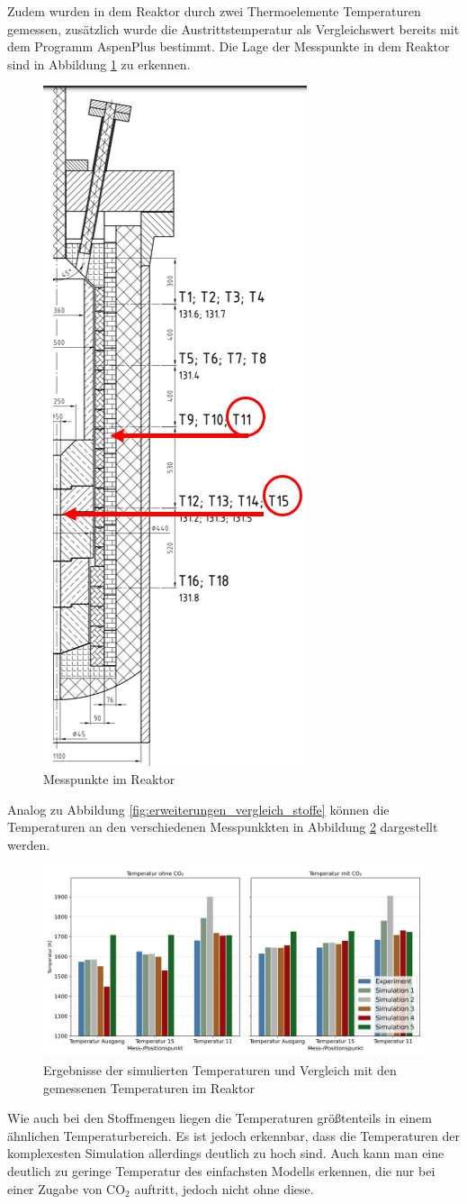         Zudem wurden in dem Reaktor durch zwei Thermoelemente Temperaturen gemessen, zusätzlich wurde die Austrittstemperatur als Vergleichswert bereits mit dem Programm AspenPlus bestimmt. Die Lage der Messpunkte in dem Reaktor sind in Abbildung \ref{fig:erweiterungen_messpunkte} zu erkennen. 
        \begin{figure}[H]
            \centering
            \includegraphics[width=0.2\linewidth]{img/Erweiterungen/Messpunkte.png}
            \caption{Messpunkte im Reaktor \cite{gonzales}}
            \label{fig:erweiterungen_messpunkte}
        \end{figure}
        Analog zu Abbildung \ref{fig:erweiterungen_vergleich_stoffe} können die Temperaturen an den verschiedenen Messpunkkten in Abbildung \ref{fig:erweiterungen_vergleich_temperaturen} dargestellt werden. 
        \begin{figure}[H]
            \centering
            \includegraphics[width=0.9\linewidth]{img/Erweiterungen/Vergleich_Temperaturen.png}
            \caption{Ergebnisse der simulierten Temperaturen und Vergleich mit den gemessenen Temperaturen im Reaktor \cite{gonzales}}
            \label{fig:erweiterungen_vergleich_temperaturen}
        \end{figure}
        Wie auch bei den Stoffmengen liegen die Temperaturen größtenteils in einem ähnlichen Temperaturbereich. Es ist jedoch erkennbar, dass die Temperaturen der komplexesten Simulation allerdings deutlich zu hoch sind. Auch kann man eine deutlich zu geringe Temperatur des einfachsten Modells erkennen, die nur bei einer Zugabe von CO$_2$ auftritt, jedoch nicht ohne diese. 

